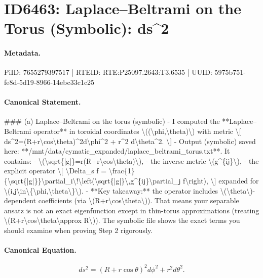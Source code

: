 \section*{ID6463: Laplace–Beltrami on the Torus (Symbolic): ds\textasciicircum{}2}
\paragraph{Metadata.}
PiID: 7655279397517 | RTEID: RTE:P25097.2643:T3.6535 | UUID: 5975b751-fe8d-5d19-8966-14ebc33c1c25

\paragraph{Canonical Statement.}
\#\#\# (a) Laplace–Beltrami on the torus (symbolic) - I computed the **Laplace–Beltrami operator** in toroidal coordinates \textbackslash{}((\textbackslash{}phi,\textbackslash{}theta)\textbackslash{}) with metric \textbackslash{}[ ds\textasciicircum{}2=(R+r\textbackslash{}cos\textbackslash{}theta)\textasciicircum{}2d\textbackslash{}phi\textasciicircum{}2 + r\textasciicircum{}2 d\textbackslash{}theta\textasciicircum{}2. \textbackslash{}] - Output (symbolic) saved here: **/mnt/data/cymatic\_expanded/laplace\_beltrami\_torus.txt**. It contains: - \textbackslash{}(\textbackslash{}sqrt\{|g|\}=r(R+r\textbackslash{}cos\textbackslash{}theta)\textbackslash{}), - the inverse metric \textbackslash{}(g\textasciicircum{}\{ij\}\textbackslash{}), - the explicit operator \textbackslash{}[ \textbackslash{}Delta\_s f = \textbackslash{}frac\{1\}\{\textbackslash{}sqrt\{|g|\}\}\textbackslash{}partial\_i\textbackslash{}!\textbackslash{}left(\textbackslash{}sqrt\{|g|\}\textbackslash{},g\textasciicircum{}\{ij\}\textbackslash{}partial\_j f\textbackslash{}right), \textbackslash{}] expanded for \textbackslash{}(i,j\textbackslash{}in\textbackslash{}\{\textbackslash{}phi,\textbackslash{}theta\textbackslash{}\}\textbackslash{}). - **Key takeaway:** the operator includes \textbackslash{}(\textbackslash{}theta\textbackslash{})-dependent coefficients (via \textbackslash{}(R+r\textbackslash{}cos\textbackslash{}theta\textbackslash{})). That means your separable ansatz is not an exact eigenfunction except in thin-torus approximations (treating \textbackslash{}(R+r\textbackslash{}cos\textbackslash{}theta\textbackslash{}approx R\textbackslash{})). The symbolic file shows the exact terms you should examine when proving Step 2 rigorously.

\paragraph{Canonical Equation.}
\[
ds^2=(R+r\cos\theta)^2d\phi^2 + r^2 d\theta^2.
\]

